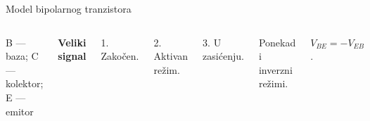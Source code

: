 \begin{frame}[label=10-s005]{Model bipolarnog tranzistora}
\setlength{\abovedisplayskip}{4pt}\setlength{\belowdisplayskip}{4pt}\setlength{\abovedisplayshortskip}{3pt}\setlength{\belowdisplayshortskip}{3pt}
\begin{columns}[T,onlytextwidth]\centering
\par\smallskip
B — baza; C — kolektor; E — emitor\par\medskip
{}\medskip
\hspace{6mm}\centering \par\medskip
\raggedright\textbf{Veliki signal}\par
1. Zakočen.\par 2. Aktivan režim.\par 3. U zasićenju.\par
Ponekad i inverzni režimi.\par\bigskip
$V_{BE}=-V_{EB}$.\end{columns}
\end{frame}
